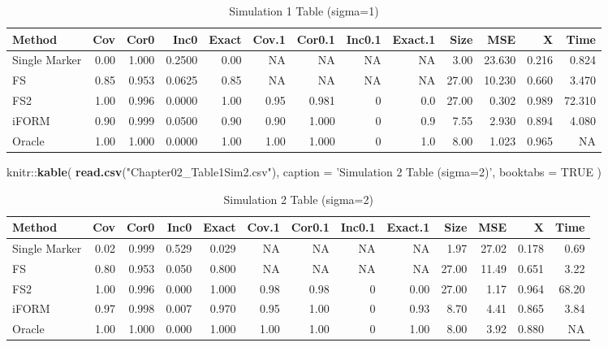 \documentclass[11pt,]{book}
\newenvironment{Shaded}{\begin{snugshade}}{\end{snugshade}}
\newcommand{\KeywordTok}[1]{\textcolor[rgb]{0.13,0.29,0.53}{\textbf{{#1}}}}
\newcommand{\DataTypeTok}[1]{\textcolor[rgb]{0.13,0.29,0.53}{{#1}}}
\newcommand{\StringTok}[1]{\textcolor[rgb]{0.31,0.60,0.02}{{#1}}}
\newcommand{\OtherTok}[1]{\textcolor[rgb]{0.56,0.35,0.01}{{#1}}}
\newcommand{\NormalTok}[1]{{#1}}
\theoremstyle{definition}
\theoremstyle{definition}
\theoremstyle{remark}
\begin{document}
\begin{table}

\caption{\label{tab:sim1}Simulation 1 Table (sigma=1)}
\centering
\begin{tabular}[t]{lrrrrrrrrrrrr}
\toprule
Method & Cov & Cor0 & Inc0 & Exact & Cov.1 & Cor0.1 & Inc0.1 & Exact.1 & Size & MSE & X & Time\\
\midrule
Single Marker & 0.00 & 1.000 & 0.2500 & 0.00 & NA & NA & NA & NA & 3.00 & 23.630 & 0.216 & 0.824\\
FS & 0.85 & 0.953 & 0.0625 & 0.85 & NA & NA & NA & NA & 27.00 & 10.230 & 0.660 & 3.470\\
FS2 & 1.00 & 0.996 & 0.0000 & 1.00 & 0.95 & 0.981 & 0 & 0.0 & 27.00 & 0.302 & 0.989 & 72.310\\
iFORM & 0.90 & 0.999 & 0.0500 & 0.90 & 0.90 & 1.000 & 0 & 0.9 & 7.55 & 2.930 & 0.894 & 4.080\\
Oracle & 1.00 & 1.000 & 0.0000 & 1.00 & 1.00 & 1.000 & 0 & 1.0 & 8.00 & 1.023 & 0.965 & NA\\
\bottomrule
\end{tabular}
\end{table}

\begin{Shaded}
\begin{Highlighting}[]
\NormalTok{knitr::}\KeywordTok{kable}\NormalTok{(}
  \KeywordTok{read.csv}\NormalTok{(}\StringTok{"Chapter02_Table1Sim2.csv"}\NormalTok{), }\DataTypeTok{caption =} \StringTok{'Simulation 2 Table (sigma=2)'}\NormalTok{,}
  \DataTypeTok{booktabs =} \OtherTok{TRUE}
\NormalTok{)}
\end{Highlighting}
\end{Shaded}

\begin{table}

\caption{\label{tab:sim2}Simulation 2 Table (sigma=2)}
\centering
\begin{tabular}[t]{lrrrrrrrrrrrr}
\toprule
Method & Cov & Cor0 & Inc0 & Exact & Cov.1 & Cor0.1 & Inc0.1 & Exact.1 & Size & MSE & X & Time\\
\midrule
Single Marker & 0.02 & 0.999 & 0.529 & 0.029 & NA & NA & NA & NA & 1.97 & 27.02 & 0.178 & 0.69\\
FS & 0.80 & 0.953 & 0.050 & 0.800 & NA & NA & NA & NA & 27.00 & 11.49 & 0.651 & 3.22\\
FS2 & 1.00 & 0.996 & 0.000 & 1.000 & 0.98 & 0.98 & 0 & 0.00 & 27.00 & 1.17 & 0.964 & 68.20\\
iFORM & 0.97 & 0.998 & 0.007 & 0.970 & 0.95 & 1.00 & 0 & 0.93 & 8.70 & 4.41 & 0.865 & 3.84\\
Oracle & 1.00 & 1.000 & 0.000 & 1.000 & 1.00 & 1.00 & 0 & 1.00 & 8.00 & 3.92 & 0.880 & NA\\
\bottomrule
\end{tabular}
\end{table}
\end{document}
